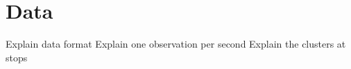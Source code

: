 \chapter{Data}






Explain data format
Explain one observation per second
Explain the clusters at stops
